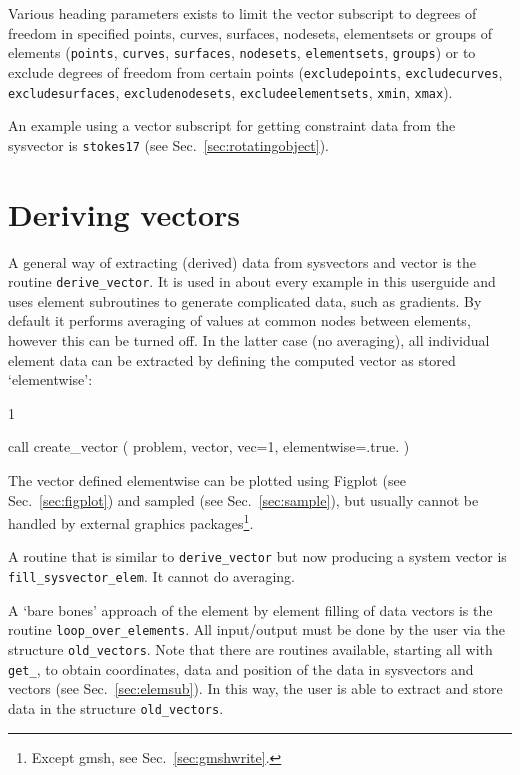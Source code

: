 Various heading parameters exists to limit the vector subscript to degrees of
freedom in specified points, curves, surfaces, nodesets, elementsets or groups of elements
(\texttt{points}, \texttt{curves}, \texttt{surfaces}, \texttt{nodesets}, \texttt{elementsets},
\texttt{groups})
or to exclude degrees of freedom from
certain points (\texttt{excludepoints}, \texttt{excludecurves},
\texttt{excludesurfaces}, \texttt{excludenodesets}, \texttt{excludeelementsets},
\texttt{xmin}, \texttt{xmax}).

An example using a vector subscript for getting constraint data from
the sysvector is \texttt{stokes17} (see Sec.~\ref{sec:rotatingobject}).

\section{Deriving vectors}

A general way of extracting (derived) data from sysvectors and vector is
the routine \texttt{derive\_vector}. It is used in about every example in this
userguide and uses element subroutines to generate complicated data, such as
gradients. By default it performs averaging of values at
common nodes between elements, however this can be turned off. In the latter
case (no averaging), all individual element data can be extracted by defining
the computed vector as stored `elementwise':
\begin{listing}{1}
   
  call create_vector ( problem, vector, vec=1, elementwise=.true. )

\end{listing}
The vector defined elementwise can be plotted using Figplot
(see Sec.~\ref{sec:figplot}) and sampled (see Sec.~\ref{sec:sample}), but
usually cannot be handled by external graphics packages\footnote{Except gmsh,
 see Sec.~\ref{sec:gmshwrite}.}.

A routine that is similar to \texttt{derive\_vector} but now producing a system
vector is \texttt{fill\_sysvector\_elem}. It cannot do averaging.

A `bare bones' approach of the element by element filling of data vectors is
the routine \texttt{loop\_over\_elements}. All input/output must be done by the
user via the structure \texttt{old\_vectors}. Note that there are routines
available, starting all with \texttt{get\_}, to obtain coordinates,
data and position of the data in sysvectors and vectors (see
Sec.~\ref{sec:elemsub}). In this way, the user is able to extract and store
data in the structure \texttt{old\_vectors}.

